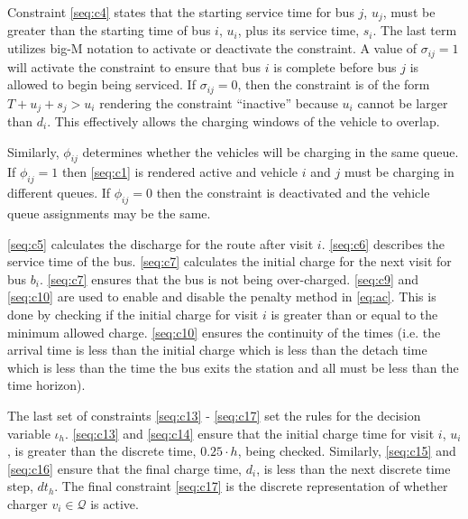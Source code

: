 \documentclass[11pt,a4paper,final]{article}
\newcommand{\Qset}{\mathcal{Q}}             %
\begin{document}
Constraint \ref{seq:c4} states that the starting service time for bus \(j\), \(u_j\), must be greater than the starting time
of bus \(i\), \(u_i\), plus its service time, \(s_i\). The last term utilizes big-M notation to activate or deactivate the
constraint. A value of \(\sigma_{ij} = 1\) will activate the constraint to ensure that bus \(i\) is complete before bus \(j\) is
allowed to begin being serviced. If \(\sigma_{ij} = 0\), then the constraint is of the form \(T + u_j + s_j > u_i\) rendering the
constraint ``inactive'' because \(u_i\) cannot be larger than \(d_i\). This effectively allows the charging windows of the
vehicle to overlap.

Similarly, \(\phi_{ij}\) determines whether the vehicles will be charging in the same queue. If \(\phi_{ij} = 1\) then
\eqref{seq:c1} is rendered active and vehicle \(i\) and \(j\) must be charging in different queues. If \(\phi_{ij} = 0\) then the
constraint is deactivated and the vehicle queue assignments may be the same.

\ref{seq:c5} calculates the discharge for the route after visit \(i\). \ref{seq:c6} describes the service time of the bus.
\ref{seq:c7} calculates the initial charge for the next visit for bus \(b_i\). \ref{seq:c7} ensures that the bus is not
being over-charged. \ref{seq:c9} and \ref{seq:c10} are used to enable and disable the penalty method in \ref{eq:ac}. This is
done by checking if the initial charge for visit \(i\) is greater than or equal to the minimum allowed charge.
\ref{seq:c10} ensures the continuity of the times (i.e. the arrival time is less than the initial charge which is less
than the detach time which is less than the time the bus exits the station and all must be less than the time horizon).

The last set of constraints \ref{seq:c13} - \ref{seq:c17} set the rules for the decision variable \(\iota_h\). \ref{seq:c13}
and \ref{seq:c14} ensure that the initial charge time for visit \(i\), \(u_i\), is greater than the discrete time, \(0.25 \cdot
h\), being checked. Similarly, \ref{seq:c15} and \ref{seq:c16} ensure that the final charge time, \(d_i\), is less than the
next discrete time step, \(dt_h\). The final constraint \ref{seq:c17} is the discrete representation of whether charger
\(v_i \in \Qset\) is active.
\end{document}
